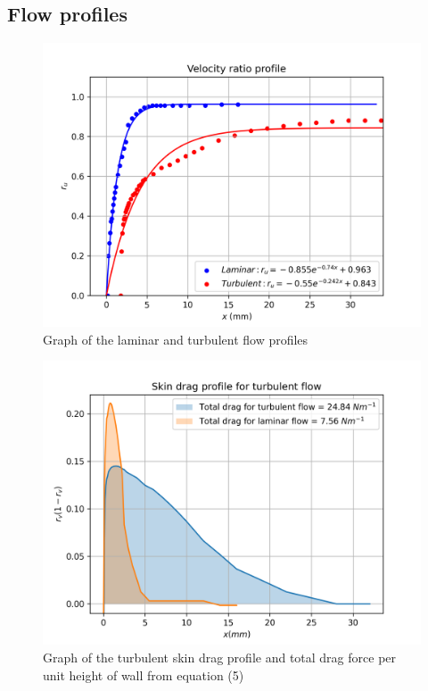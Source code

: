 \documentclass{article}
\begin{document}
\subsection{Flow profiles}

\begin{figure}[H]
\centering
\includegraphics[width=1\textwidth]{velocity_profiles.png}
\caption{\label{fig:velocity_profiles} Graph of the laminar and turbulent flow profiles}
\end{figure}

\begin{figure}[H]
\centering
\includegraphics[width=1\textwidth]{drag_profiles.png}
\caption{\label{fig:drag_profiles} Graph of the turbulent skin drag profile and total drag force per unit height of wall from equation (5)}
\end{figure}
\end{document}
